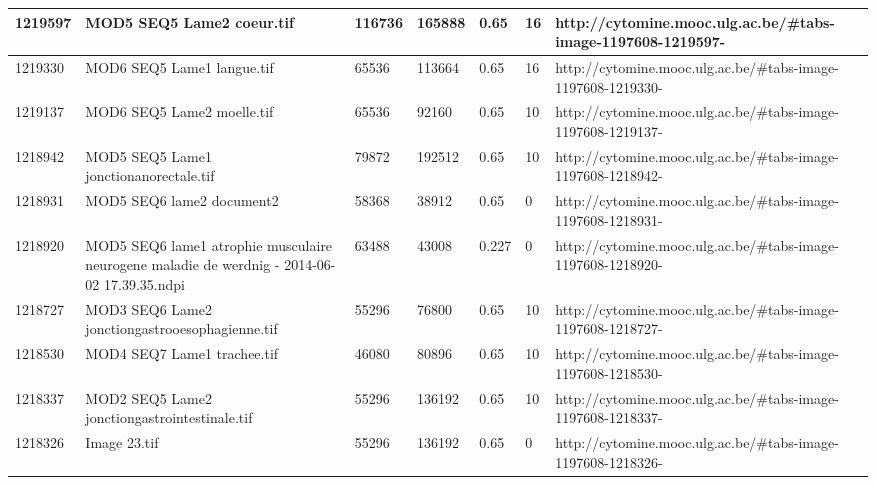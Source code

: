 \documentclass[a4paper,11pt]{report}
\numberwithin{figure}{chapter} %
\begin{document}
\begin{table}[]
{\begin{tabular}{|l|l|l|l|l|l|l|}
1219597  & MOD5 SEQ5 Lame2 coeur.tif                                                                    & 116736 & 165888 & 0.65                  & 16          & http://cytomine.mooc.ulg.ac.be/\#tabs-image-1197608-1219597-  \\ \hline
1219330  & MOD6 SEQ5 Lame1 langue.tif                                                                   & 65536  & 113664 & 0.65                  & 16          & http://cytomine.mooc.ulg.ac.be/\#tabs-image-1197608-1219330-  \\ \hline
1219137  & MOD6 SEQ5 Lame2 moelle.tif                                                                   & 65536  & 92160  & 0.65                  & 10          & http://cytomine.mooc.ulg.ac.be/\#tabs-image-1197608-1219137-  \\ \hline
1218942  & MOD5 SEQ5 Lame1 jonctionanorectale.tif                                                       & 79872  & 192512 & 0.65                  & 10          & http://cytomine.mooc.ulg.ac.be/\#tabs-image-1197608-1218942-  \\ \hline
1218931  & MOD5 SEQ6 lame2 document2                                                                    & 58368  & 38912  & 0.65                  & 0           & http://cytomine.mooc.ulg.ac.be/\#tabs-image-1197608-1218931-  \\ \hline
1218920  & MOD5 SEQ6 lame1 atrophie musculaire neurogene  maladie de werdnig - 2014-06-02 17.39.35.ndpi & 63488  & 43008  & 0.227                 & 0           & http://cytomine.mooc.ulg.ac.be/\#tabs-image-1197608-1218920-  \\ \hline
1218727  & MOD3 SEQ6 Lame2 jonctiongastrooesophagienne.tif                                              & 55296  & 76800  & 0.65                  & 10          & http://cytomine.mooc.ulg.ac.be/\#tabs-image-1197608-1218727-  \\ \hline
1218530  & MOD4 SEQ7 Lame1 trachee.tif                                                                  & 46080  & 80896  & 0.65                  & 10          & http://cytomine.mooc.ulg.ac.be/\#tabs-image-1197608-1218530-  \\ \hline
1218337  & MOD2 SEQ5 Lame2 jonctiongastrointestinale.tif                                                & 55296  & 136192 & 0.65                  & 10          & http://cytomine.mooc.ulg.ac.be/\#tabs-image-1197608-1218337-  \\ \hline
1218326  & Image 23.tif                                                                                 & 55296  & 136192 & 0.65                  & 0           & http://cytomine.mooc.ulg.ac.be/\#tabs-image-1197608-1218326-  \\ \hline

\end{tabular}}
\end{table}
\end{document}
